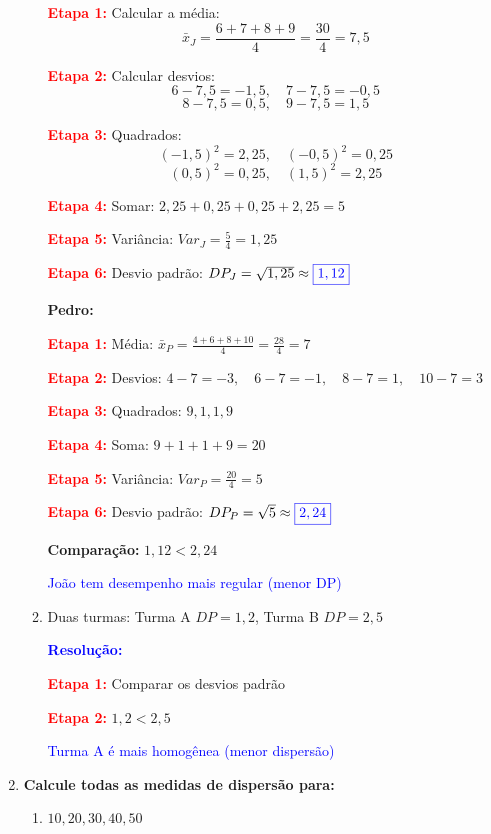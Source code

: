 \documentclass[11pt]{article}
\newcommand{\respostaNum}[1]{\textcolor{blue}{\boxed{#1}}}
\newcommand{\respostaTxt}[1]{\textcolor{blue}{#1}}
\newcommand{\resolucao}{\textbf{\textcolor{blue}{Resolução:}}}
\begin{document}
\begin{multicols}{2}
\begin{enumerate}[leftmargin=*]
\begin{enumerate}[label=\alph*)]
\textbf{\textcolor{red}{Etapa 1:}} Calcular a média:
\[
\bar{x}_J = \frac{6+7+8+9}{4} = \frac{30}{4} = 7,5
\]

\textbf{\textcolor{red}{Etapa 2:}} Calcular desvios:
\[6-7,5 = -1,5,\quad 7-7,5 = -0,5 \] 
\[8-7,5 = 0,5,\quad 9-7,5 = 1,5\]

\textbf{\textcolor{red}{Etapa 3:}} Quadrados:
\[
    (-1,5)^2 = 2,25,\quad (-0,5)^2 = 0,25 \] 
\[ (0,5)^2 = 0,25,\quad (1,5)^2 = 2,25 \]

\textbf{\textcolor{red}{Etapa 4:}} Somar: $2,25 + 0,25 + 0,25 + 2,25 = 5$

\textbf{\textcolor{red}{Etapa 5:}} Variância: $Var_J = \frac{5}{4} = 1,25$

\textbf{\textcolor{red}{Etapa 6:}} Desvio padrão: $DP_J = \sqrt{1,25} \approx \respostaNum{1,12}$

\textbf{Pedro:}

\textbf{\textcolor{red}{Etapa 1:}} Média: $\bar{x}_P = \frac{4+6+8+10}{4} = \frac{28}{4} = 7$

\textbf{\textcolor{red}{Etapa 2:}} Desvios: $4-7 = -3,\quad 6-7 = -1,\quad 8-7 = 1,\quad 10-7 = 3$

\textbf{\textcolor{red}{Etapa 3:}} Quadrados: $9, 1, 1, 9$

\textbf{\textcolor{red}{Etapa 4:}} Soma: $9+1+1+9 = 20$

\textbf{\textcolor{red}{Etapa 5:}} Variância: $Var_P = \frac{20}{4} = 5$

\textbf{\textcolor{red}{Etapa 6:}} Desvio padrão: $DP_P = \sqrt{5} \approx \respostaNum{2,24}$

\textbf{Comparação:} $1,12 < 2,24$

\respostaTxt{João tem desempenho mais regular (menor DP)}

\item Duas turmas: Turma A $DP = 1,2$, Turma B $DP = 2,5$

\resolucao

\textbf{\textcolor{red}{Etapa 1:}} Comparar os desvios padrão

\textbf{\textcolor{red}{Etapa 2:}} $1,2 < 2,5$

\respostaTxt{Turma A é mais homogênea (menor dispersão)}
\end{enumerate}

\item \textbf{Calcule todas as medidas de dispersão para:}

\begin{enumerate}[label=\alph*)]
\item $10, 20, 30, 40, 50$


\end{enumerate}
\end{enumerate}
\end{multicols}
\end{document}
